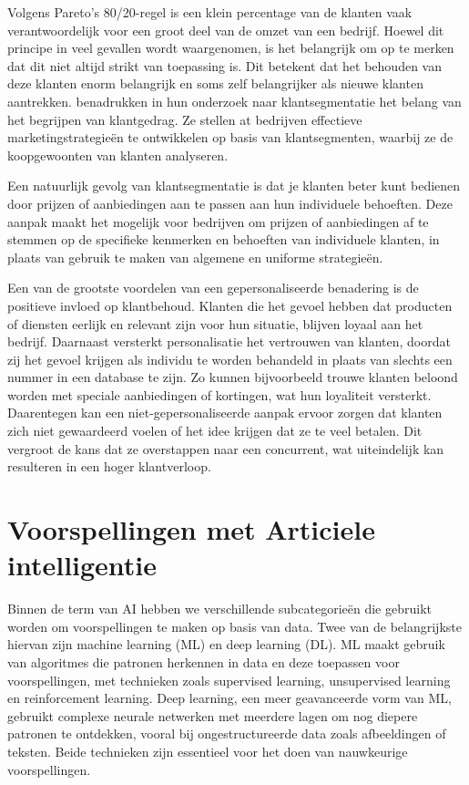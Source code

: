 Volgens Pareto’s 80/20-regel is een klein percentage van de klanten vaak verantwoordelijk voor een groot deel van de omzet van een bedrijf. Hoewel dit principe in veel gevallen wordt waargenomen, is het belangrijk om op te merken dat dit niet altijd strikt van toepassing is. Dit betekent dat het behouden van deze klanten enorm belangrijk en soms zelf belangrijker als nieuwe klanten aantrekken. \textcite{Wu2011} benadrukken in hun onderzoek naar klantsegmentatie het belang van het begrijpen van klantgedrag. Ze stellen at bedrijven effectieve marketingstrategieën te ontwikkelen op basis van klantsegmenten, waarbij ze de koopgewoonten van klanten analyseren. 

\vspace{1 em}

Een natuurlijk gevolg van klantsegmentatie is dat je klanten beter kunt bedienen door prijzen of aanbiedingen aan te passen aan hun individuele behoeften. Deze aanpak maakt het mogelijk voor bedrijven om prijzen of aanbiedingen af te stemmen op de specifieke kenmerken en behoeften van individuele klanten, in plaats van gebruik te maken van algemene en uniforme strategieën.

\vspace{1 em}

Een van de grootste voordelen van een gepersonaliseerde benadering is de positieve invloed op klantbehoud. Klanten die het gevoel hebben dat producten of diensten eerlijk en relevant zijn voor hun situatie, blijven loyaal aan het bedrijf. Daarnaast versterkt personalisatie het vertrouwen van klanten, doordat zij het gevoel krijgen als individu te worden behandeld in plaats van slechts een nummer in een database te zijn. Zo kunnen bijvoorbeeld trouwe klanten beloond worden met speciale aanbiedingen of kortingen, wat hun loyaliteit versterkt. Daarentegen kan een niet-gepersonaliseerde aanpak ervoor zorgen dat klanten zich niet gewaardeerd voelen of het idee krijgen dat ze te veel betalen. Dit vergroot de kans dat ze overstappen naar een concurrent, wat uiteindelijk kan resulteren in een hoger klantverloop.\autocite{Adeniran2024}


\section{Voorspellingen met Articiele intelligentie}  

Binnen de term van AI hebben we verschillende subcategorieën die gebruikt worden om voorspellingen te maken op basis van data. Twee van de belangrijkste hiervan zijn machine learning (ML) en deep learning (DL). ML maakt gebruik van algoritmes die patronen herkennen in data en deze toepassen voor voorspellingen, met technieken zoals supervised learning, unsupervised learning en reinforcement learning. Deep learning, een meer geavanceerde vorm van ML, gebruikt complexe neurale netwerken met meerdere lagen om nog diepere patronen te ontdekken, vooral bij ongestructureerde data zoals afbeeldingen of teksten. Beide technieken zijn essentieel voor het doen van nauwkeurige voorspellingen.

